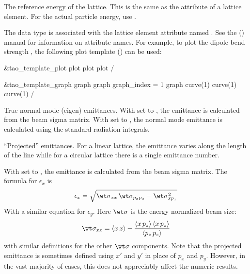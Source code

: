 \begin{description}
{{{{{  %
  \item[e_tot_ref] \Newline {}
The reference energy of the lattice. This is the same as the  attribute of a lattice element.
For the actual particle energy, use .

  \item[element_attrib.<attrib_name>] \Newline {}
The  data type is associated with the
lattice element attribute named . See the \bmad
(\cite{b:bmad}) manual for information on attribute names. For
example, to plot the dipole bend strength , the following
plot template () can be used:
\begin{example}
  &tao_template_plot
    plot%
    plot%
    plot%
  /

  &tao_template_graph
    graph%
    graph%
    graph_index = 1
    graph%
    curve(1)%
    curve(1)%
    curve(1)%
  /
\end{example}

  \item[emit.a, .b, .c] \Newline {}
True normal mode (eigen) emittances.  With  set to , the
emittance is calculated from the beam sigma matrix. With  set to
, the normal mode emittance is calculated using the standard radiation
integrals.

  \item[emit.x, .y, .z] \Newline {}
``Projected'' emittances\cite{b:emit}. 
For a linear lattice, the emittance varies along the length
of the line while for a circular lattice there is a single emittance
number. 

With  set to , the emittance is calculated from the beam sigma
matrix. The formula for $\epsilon_x$ is
\begin{equation}
  \epsilon_x = \sqrt{ \wt\sigma_{xx} \, \wt\sigma_{p_xp_x} - \wt\sigma_{xp_x}^2}
\end{equation}
With a similar equation for $\epsilon_y$. Here $\wt\sigma$ is the energy normalized
beam size:
\begin{equation}
  \wt\sigma_{xx} = \langle x \, x \rangle - 
  \frac{\langle x \, p_z \rangle \, \langle x \, p_z \rangle}{\langle p_z \, p_z \rangle}
\end{equation}
with similar definitions for the other $\wt\sigma$ components. 
Note that the projected emittance is sometimes defined using
$x'$ and $y'$ in place of $p_x$ and $p_y$. However, in the vast
majority of cases, this does not appreciably affect the numeric
results.

}}}}}
\end{description}
